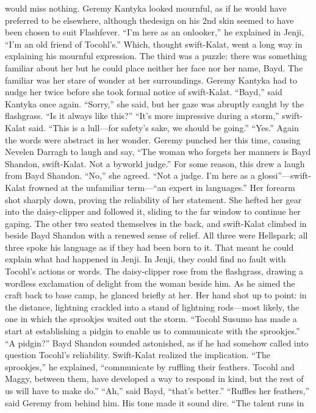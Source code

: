 \documentclass[9pt]{article}
\begin{document}
would miss nothing.
Geremy Kantyka looked mournful, as if he would have preferred to be elsewhere, although thedesign on his 2nd skin seemed to have been chosen to suit Flashfever. “I’m here as an onlooker,” he
explained in Jenji, “I’m an old friend of Tocohl’s.” Which, thought swift-Kalat, went a long way in
explaining his mournful expression.
The third was a puzzle: there was something familiar about her but he could place neither her face nor
her name, Bayd. The familiar was her stare of wonder at her surroundings. Geremy Kantyka had to
nudge her twice before she took formal notice of swift-Kalat. “Bayd,” said Kantyka once again.
“Sorry,” she said, but her gaze was abruptly caught by the flashgrass. “Is it always like this?”
“It’s more impressive during a storm,” swift-Kalat said. “This is a lull—for safety’s sake, we should
be going.”
“Yes.” Again the words were abstract in her wonder. Geremy punched her this time, causing
Nevelen Darragh to laugh and say, “The woman who forgets her manners is Bayd Shandon, swift-Kalat.
Not a byworld judge.” For some reason, this drew a laugh from Bayd Shandon.
“No,” she agreed. “Not a judge. I’m here as a glossi”—swift-Kalat frowned at the unfamiliar
term—“an expert in languages.” Her forearm shot sharply down, proving the reliability of her statement.
She hefted her gear into the daisy-clipper and followed it, sliding to the far window to continue her
gaping. The other two seated themselves in the back, and swift-Kalat climbed in beside Bayd Shandon
with a renewed sense of relief. All three were Hellspark; all three spoke his language as if they had been
born to it. That meant he could explain what had happened in Jenji. In Jenji, they could find no fault with
Tocohl’s actions or words.
The daisy-clipper rose from the flashgrass, drawing a wordless exclamation of delight from the
woman beside him. As he aimed the craft back to base camp, he glanced briefly at her. Her hand shot up
to point: in the distance, lightning crackled into a stand of lightning rods—most likely, the one in which the
sprookjes waited out the storm.
“Tocohl Susumo has made a start at establishing a pidgin to enable us to communicate with the
sprookjes.”
“A pidgin?” Bayd Shandon sounded astonished, as if he had somehow called into question Tocohl’s
reliability.
Swift-Kalat realized the implication. “The sprookjes,” he explained, “communicate by ruffling their
feathers. Tocohl and Maggy, between them, have developed a way to respond in kind, but the rest of us
will have to make do.”
“Ah,” said Bayd, “that’s better.”
“Ruffles her feathers,” said Geremy from behind him. His tone made it sound dire. “The talent runs in
\end{document}
